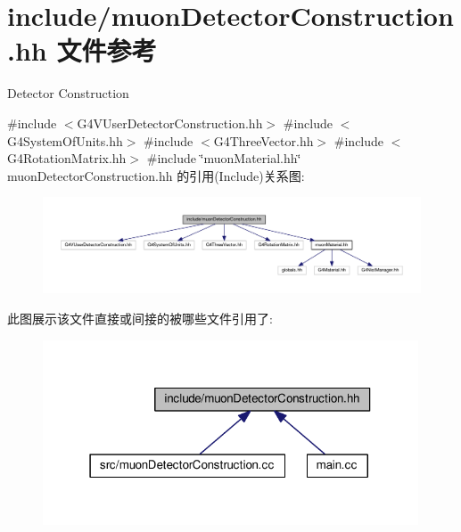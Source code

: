 \hypertarget{muonDetectorConstruction_8hh}{}\section{include/muon\+Detector\+Construction.hh 文件参考}
\label{muonDetectorConstruction_8hh}


Detector Construction  


{\ttfamily \#include $<$G4\+V\+User\+Detector\+Construction.\+hh$>$}\newline
{\ttfamily \#include $<$G4\+System\+Of\+Units.\+hh$>$}\newline
{\ttfamily \#include $<$G4\+Three\+Vector.\+hh$>$}\newline
{\ttfamily \#include $<$G4\+Rotation\+Matrix.\+hh$>$}\newline
{\ttfamily \#include \char`\"{}muon\+Material.\+hh\char`\"{}}\newline
muon\+Detector\+Construction.\+hh 的引用(Include)关系图\+:\nopagebreak
\begin{figure}[H]
\begin{center}
\leavevmode
\includegraphics[width=350pt]{muonDetectorConstruction_8hh__incl}
\end{center}
\end{figure}
此图展示该文件直接或间接的被哪些文件引用了\+:\nopagebreak
\begin{figure}[H]
\begin{center}
\leavevmode
\includegraphics[width=316pt]{muonDetectorConstruction_8hh__dep__incl}
\end{center}
\end{figure}
